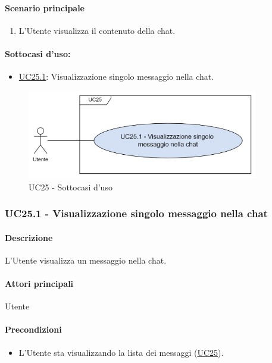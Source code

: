 \paragraph*{Scenario principale}
\begin{enumerate}
  \item L'Utente visualizza il contenuto della chat.
\end{enumerate}

\paragraph*{Sottocasi d'uso:}
\begin{itemize}
  \item \hyperref[UC25point1]{UC25.1}: Visualizzazione singolo messaggio nella chat.
\end{itemize}

\begin{figure}[H]
  \centering
  \includegraphics[width=0.90\textwidth]{assets/uc25_1.png}
  \caption{UC25 - Sottocasi d'uso}
\end{figure}


\subsubsection{UC25.1 - Visualizzazione singolo messaggio nella chat}\label{UC25point1}
\paragraph*{Descrizione}
L'Utente visualizza un messaggio nella chat.

\paragraph*{Attori principali}
Utente

\paragraph*{Precondizioni}
\begin{itemize}
  \item L'Utente sta visualizzando la lista dei messaggi (\hyperref[UC25]{UC25}).
\end{itemize}

